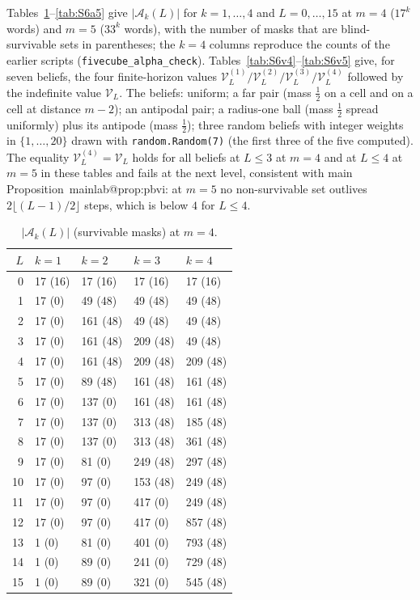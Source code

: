 \documentclass[11pt,a4paper]{article}
\makeatletter
\theoremstyle{plain}
\theoremstyle{definition}
\theoremstyle{remark}
\newcommand{\calA}{\mathcal{A}}
\newcommand{\tfr}[2]{\tfrac{#1}{#2}}
\newcommand{\mref}[1]{\csname mainlab@#1\endcsname}
\makeatother
\begin{document}
Tables~\ref{tab:S6a4}--\ref{tab:S6a5} give $|\calA_k(L)|$ for $k=1,\dots,4$ and $L=0,\dots,15$ at $m=4$ ($17^k$ words) and $m=5$ ($33^k$ words), with the number of masks that are blind-survivable sets in parentheses; the $k=4$ columns reproduce the counts of the earlier scripts (\texttt{fivecube\_alpha\_check}). Tables~\ref{tab:S6v4}--\ref{tab:S6v5} give, for seven beliefs, the four finite-horizon values $\mathcal V^{(1)}_L/\mathcal V^{(2)}_L/\mathcal V^{(3)}_L/\mathcal V^{(4)}_L$ followed by the indefinite value $\mathcal V_L$. The beliefs: uniform; a far pair (mass $\tfr12$ on a cell and on a cell at distance $m-2$); an antipodal pair; a radius-one ball (mass $\tfr12$ spread uniformly) plus its antipode (mass $\tfr12$); three random beliefs with integer weights in $\{1,\dots,20\}$ drawn with \texttt{random.Random(7)} (the first three of the five computed). The equality $\mathcal V^{(4)}_L=\mathcal V_L$ holds for all beliefs at $L\le3$ at $m=4$ and at $L\le4$ at $m=5$ in these tables and fails at the next level, consistent with main Proposition~\mref{prop:pbvi}: at $m=5$ no non-survivable set outlives $2\lfloor(L-1)/2\rfloor$ steps, which is below $4$ for $L\le4$.
\begin{table}[H]\centering\small
\caption{$|\calA_k(L)|$ (survivable masks) at $m=4$.}\label{tab:S6a4}
\begin{tabular}{rllll}
\toprule
$L$ & $k=1$ & $k=2$ & $k=3$ & $k=4$\\
\midrule
0 & 17 (16) & 17 (16) & 17 (16) & 17 (16)\\
1 & 17 (0) & 49 (48) & 49 (48) & 49 (48)\\
2 & 17 (0) & 161 (48) & 49 (48) & 49 (48)\\
3 & 17 (0) & 161 (48) & 209 (48) & 49 (48)\\
4 & 17 (0) & 161 (48) & 209 (48) & 209 (48)\\
5 & 17 (0) & 89 (48) & 161 (48) & 161 (48)\\
6 & 17 (0) & 137 (0) & 161 (48) & 161 (48)\\
7 & 17 (0) & 137 (0) & 313 (48) & 185 (48)\\
8 & 17 (0) & 137 (0) & 313 (48) & 361 (48)\\
9 & 17 (0) & 81 (0) & 249 (48) & 297 (48)\\
10 & 17 (0) & 97 (0) & 153 (48) & 249 (48)\\
11 & 17 (0) & 97 (0) & 417 (0) & 249 (48)\\
12 & 17 (0) & 97 (0) & 417 (0) & 857 (48)\\
13 & 1 (0) & 81 (0) & 401 (0) & 793 (48)\\
14 & 1 (0) & 89 (0) & 241 (0) & 729 (48)\\
15 & 1 (0) & 89 (0) & 321 (0) & 545 (48)\\
\bottomrule
\end{tabular}
\end{table}
\end{document}

